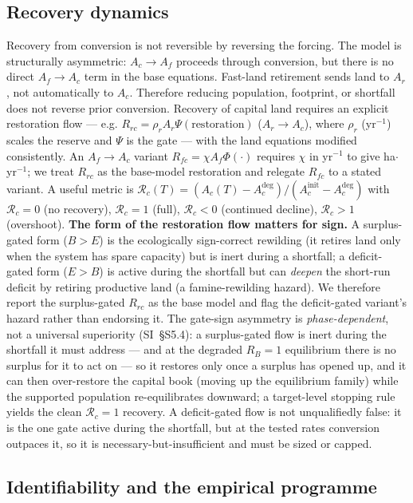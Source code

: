 \documentclass[11pt]{article}
\begin{document}
\subsection{Recovery dynamics}

Recovery from conversion is not reversible by reversing the forcing. The model is structurally asymmetric: $A_c\to A_f$ proceeds through conversion, but there is no direct $A_f\to A_c$ term in the base equations. Fast-land retirement sends land to $A_r$, not automatically to $A_c$. Therefore reducing population, footprint, or shortfall does not reverse prior conversion. Recovery of capital land requires an explicit restoration flow --- e.g. $R_{rc}=\rho_rA_r\Psi(\text{restoration})$ ($A_r\to A_c$), where $\rho_r$ (yr$^{-1}$) scales the reserve and $\Psi$ is the gate --- with the land equations modified consistently. An $A_f\to A_c$ variant $R_{fc}=\chi A_f\Phi(\cdot)$ requires $\chi$ in yr$^{-1}$ to give ha$\cdot$yr$^{-1}$; we treat $R_{rc}$ as the base-model restoration and relegate $R_{fc}$ to a stated variant. A useful metric is $\mathcal{R}_c(T)=(A_c(T)-A_c^{\mathrm{deg}})/(A_c^{\mathrm{init}}-A_c^{\mathrm{deg}})$ with $\mathcal{R}_c=0$ (no recovery), $\mathcal{R}_c=1$ (full), $\mathcal{R}_c<0$ (continued decline), $\mathcal{R}_c>1$ (overshoot). \textbf{The form of the restoration flow matters for sign.} A surplus-gated form ($B>E$) is the ecologically sign-correct rewilding (it retires land only when the system has spare capacity) but is inert during a shortfall; a deficit-gated form ($E>B$) is active during the shortfall but can \emph{deepen} the short-run deficit by retiring productive land (a famine-rewilding hazard). We therefore report the surplus-gated $R_{rc}$ as the base model and flag the deficit-gated variant's hazard rather than endorsing it. The gate-sign asymmetry is \emph{phase-dependent}, not a universal superiority (SI~\S S5.4): a surplus-gated flow is inert during the shortfall it must address --- and at the degraded $R_B=1$ equilibrium there is no surplus for it to act on --- so it restores only once a surplus has opened up, and it can then over-restore the capital book (moving up the equilibrium family) while the supported population re-equilibrates downward; a target-level stopping rule yields the clean $\mathcal{R}_c=1$ recovery. A deficit-gated flow is not unqualifiedly false: it is the one gate active during the shortfall, but at the tested rates conversion outpaces it, so it is necessary-but-insufficient and must be sized or capped.

\subsection{Identifiability and the empirical programme}
\end{document}
